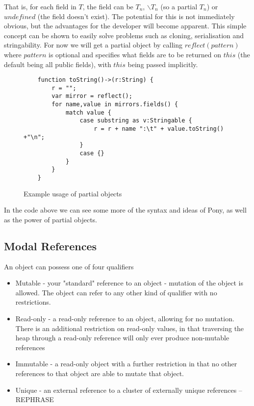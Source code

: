 \documentclass{article}
\begin{document}
That is, for each field in $T$, the field can be $T_{n}$, $\backslash T_{n}$ (so
a partial $T_{n}$) or $undefined$ (the field doesn't exist). The potential for
this is not immediately obvious, but the advantages for the developer will
become apparent. This simple concept can be shown to easily solve problems such
as cloning, serialisation and stringability. For now we will get a partial
object by calling $reflect(pattern)$ where $pattern$ is optional and
specifies what fields are to be returned on $this$ (the default being all public
fields), with $this$ being passed implicitly.

\begin{figure}[H]
\begin{verbatim}
    function toString()->(r:String) {
        r = "";
        var mirror = reflect();
        for name,value in mirrors.fields() {
            match value {
                case substring as v:Stringable {
                    r = r + name ":\t" + value.toString() +"\n";
                }
                case {}
            }
        }
    }
\end{verbatim}
\caption{Example usage of partial objects}
\label{fig:partialobj}
\end{figure}

In the code above we can see some more of the syntax and ideas of Pony, as well
as the power of partial objects.

\subsection{Modal References}
\label{sec:immutability}
An object can possess one of four qualifiers\cite{microsoft2012}

\begin{itemize}
	\item Mutable - your "standard" reference to an object - mutation of the
    object is allowed. The object can refer to any other kind of qualifier with
    no restrictions.
	\item Read-only - a read-only reference to an object, allowing for no
    mutation. There is an additional restriction on read-only values, in that
    traversing the heap	through a read-only reference will only ever produce
    non-mutable references
	\item Immutable - a read-only object with a further restriction in that no
    other references to that object are able to mutate that object.
	\item Unique - an external reference to a cluster of externally unique
    references -- REPHRASE
\end{itemize}
\end{document}

